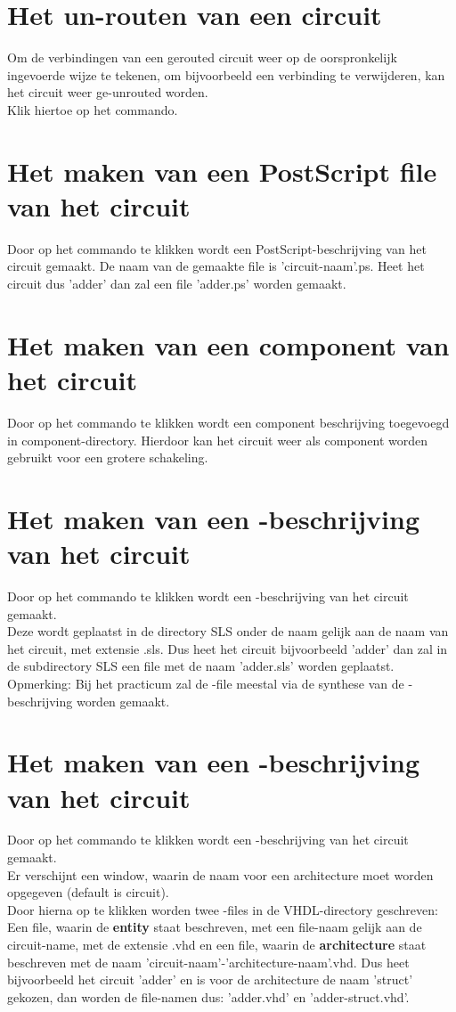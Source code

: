 \section{Het un-routen van een circuit}
Om de verbindingen van een gerouted circuit weer op de oorspronkelijk ingevoerde
wijze te tekenen, om bijvoorbeeld een verbinding te verwijderen, kan het circuit weer
ge-unrouted worden.\\
Klik hiertoe op het  commando.

\section{Het maken van een PostScript file van het circuit}
Door op het commando  te klikken wordt een PostScript-beschrijving van het
circuit gemaakt. De naam van de gemaakte file is 'circuit-naam'.ps.
Heet het circuit dus 'adder' dan zal een file 'adder.ps' worden gemaakt.

\section{Het maken van een component van het circuit}
Door op het commando  te klikken wordt een component beschrijving toegevoegd
in component-directory. Hierdoor kan het circuit weer als component worden
gebruikt voor een grotere schakeling.

\section{Het maken van een -beschrijving van het circuit}
Door op het commando  te klikken wordt een -beschrijving van het circuit
gemaakt.\\
Deze wordt geplaatst in de directory SLS onder de naam gelijk aan de naam van
het circuit, met extensie .sls. Dus heet het circuit bijvoorbeeld 'adder' dan zal in
de subdirectory SLS een file met de naam 'adder.sls' worden geplaatst.\\
Opmerking: Bij het practicum zal de -file meestal via de synthese van de
-beschrijving worden gemaakt.

\section{Het maken van een -beschrijving van het circuit}
Door op het commando  te klikken wordt een -beschrijving van het circuit
gemaakt.\\
Er verschijnt een window, waarin de naam voor een architecture moet worden
opgegeven (default is circuit).\\
Door hierna op  te klikken worden twee -files in de VHDL-directory
geschreven:\\
Een file, waarin de {\bf entity} staat beschreven, met een
file-naam gelijk aan de circuit-name, met de extensie .vhd
en een file, waarin de {\bf architecture} staat beschreven met de
naam 'circuit-naam'-'architecture-naam'.vhd.
Dus heet bijvoorbeeld het circuit 'adder' en is voor de architecture
de naam 'struct' gekozen, dan worden de file-namen dus:
'adder.vhd' en 'adder-struct.vhd'.
\cleardoublepage
